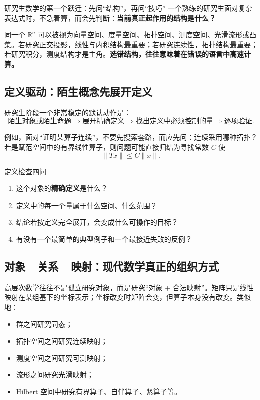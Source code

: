 \documentclass[11pt,a4paper]{ctexart}
\newcommand{\arrowchain}{\ensuremath{\Longrightarrow}}
\newcommand{\R}{\mathbb{R}}
\begin{document}
\begin{researchbox}{研究生数学的第一个跃迁：先问“结构”，再问“技巧”}
一个熟练的研究生面对复杂表达式时，不急着算，而会先判断：\textbf{当前真正起作用的结构是什么？}

同一个 $\R^n$ 可以被视为向量空间、度量空间、拓扑空间、测度空间、光滑流形或凸集。若研究正交投影，线性与内积结构最重要；若研究连续性，拓扑结构最重要；若研究积分，测度结构才是主角。\textbf{选错结构，往往意味着在错误的语言中高速计算。}
\end{researchbox}

\subsection{定义驱动：陌生概念先展开定义}

研究生阶段一个非常稳定的默认动作是：
\[
\text{陌生对象或陌生命题}
\arrowchain
\text{展开精确定义}
\arrowchain
\text{找出定义中必须控制的量}
\arrowchain
\text{逐项验证}.
\]

例如，面对“证明某算子连续”，不要先搜索套路，而应先问：连续采用哪种拓扑？若是赋范空间中的有界线性算子，则问题可能直接归结为寻找常数 $C$ 使
\[
\lVert Tx\rVert\le C\lVert x\rVert.
\]

\begin{checkbox}{定义检查四问}
\begin{enumerate}
  \item 这个对象的\textbf{精确定义}是什么？
  \item 定义中的每一个量属于什么空间、什么范围？
  \item 结论若按定义完全展开，会变成什么可操作的目标？
  \item 有没有一个最简单的典型例子和一个最接近失败的反例？
\end{enumerate}
\end{checkbox}

\subsection{对象—关系—映射：现代数学真正的组织方式}

高层次数学往往不是孤立研究对象，而是研究“对象 + 合法映射”。矩阵只是线性映射在某组基下的坐标表示；坐标改变时矩阵会变，但算子本身没有改变。类似地：
\begin{itemize}
  \item 群之间研究同态；
  \item 拓扑空间之间研究连续映射；
  \item 测度空间之间研究可测映射；
  \item 流形之间研究光滑映射；
  \item Hilbert 空间中研究有界算子、自伴算子、紧算子等。
\end{itemize}
\end{document}
